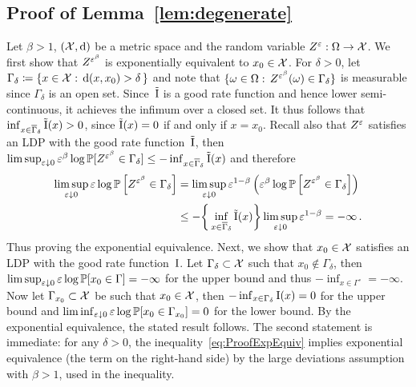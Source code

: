 \subsection{Proof of Lemma~\ref{lem:degenerate}}\label{sec:lem:degenerate_Proof}
Let $\beta > 1$, $(\mathcal{X}, \mathrm{d})$ be a metric space and the random variable ${Z^\varepsilon:\Omega\rightarrow \mathcal{X}}$. We first show that $Z^{\varepsilon^\beta}$ is exponentially equivalent to $x_0\in \mathcal{X}$. For $\delta > 0$, let~${\Gamma_{\delta} \coloneqq \{x \in \mathcal{X} : \, \mathrm{d}(x,x_0)>\delta \, \}}$ and note that $\{\omega \in \Omega : \, Z^{\varepsilon^\beta}(\omega)\in\Gamma_\delta\}$ is measurable since $\Gamma_\delta$ is an open set. 
Since~$\tilde{\mathrm{I}}$ is a good rate function and hence lower semi-continuous, it achieves the infimum over a closed set. 
It thus follows that $\inf_{x\in\overline{\Gamma}_\delta} \tilde{\mathrm{I}}(x) > 0$, since $\tilde{\mathrm{I}}(x)=0$ if and only if $x=x_0$. Recall also that $Z^\varepsilon$ satisfies an LDP with the good rate function~$\tilde{\mathrm{I}}$, then $\limsup_{\varepsilon\downarrow 0}\varepsilon^\beta\log\mathbb{P}[ Z^{\varepsilon^\beta} \in \Gamma_\delta] \leq - \inf_{x\in\overline{\Gamma}_\delta}\tilde{\mathrm{I}}(x)$ and therefore
\begin{align}\label{eq:ProofExpEquiv}
\limsup_{\varepsilon\downarrow 0} \varepsilon \log \mathbb{P} \left[ Z^{\varepsilon^\beta} \in \Gamma_\delta \right] &= \limsup_{\varepsilon\downarrow 0} \varepsilon^{1-\beta}\left(\varepsilon^\beta \log \mathbb{P} \left[ Z^{\varepsilon^\beta} \in \Gamma_\delta \right]\right) \\
&\leq -\bigg\{ \inf_{x\in\overline{\Gamma}_\delta} \tilde{\mathrm{I}}(x)\bigg\} \limsup_{\varepsilon\downarrow 0}\varepsilon^{1-\beta} = -\infty\,.\nonumber
\end{align}
Thus proving the exponential equivalence. Next, we show that $x_0\in\mathcal{X}$ satisfies an LDP with the good rate function~$\mathrm{I}$. Let $\Gamma_{\delta}\subset\mathcal{X}$ such that $x_0\notin\Gamma_{\delta}$, then $\limsup_{\varepsilon\downarrow 0} \varepsilon \log \mathbb{P}[x_0\in\Gamma]=-\infty$ for the upper bound and thus $-\inf_{x\in\Gamma^\circ}=-\infty$. Now let $\Gamma_{x_0}\subset\mathcal{X}$ be such that $x_0\in\mathcal{X}$, then $-\inf_{x\in\Gamma_{\delta}} \mathrm{I}(x)=0$ for the upper bound and $\liminf_{\varepsilon\downarrow 0}\varepsilon \log \mathbb{P}[x_0\in\Gamma_{x_0}]=0$ for the lower bound. By the exponential equivalence, the stated result follows.
The second statement is immediate:
for any $\delta>0$, 
the inequality~\eqref{eq:ProofExpEquiv}
implies exponential equivalence (the term on the right-hand side)
by the large deviations assumption with $\beta>1$, used in the inequality. 

